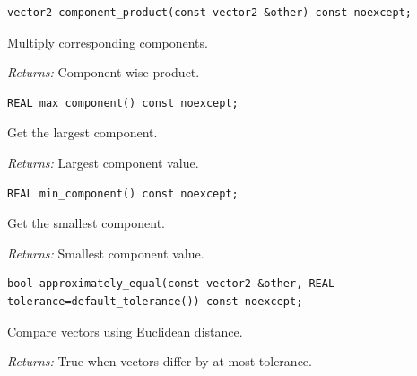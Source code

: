 \par\noindent\begin{minipage}{\linewidth}
\begin{lstlisting}[style=apireference]
vector2 component_product(const vector2 &other) const noexcept;
\end{lstlisting}
{\footnotesize Multiply corresponding components.\par}
{\footnotesize\textit{Returns:} Component-wise product.\par}
\end{minipage}\par\vspace{1pt}
\par\noindent\begin{minipage}{\linewidth}
\begin{lstlisting}[style=apireference]
REAL max_component() const noexcept;
\end{lstlisting}
{\footnotesize Get the largest component.\par}
{\footnotesize\textit{Returns:} Largest component value.\par}
\end{minipage}\par\vspace{1pt}
\par\noindent\begin{minipage}{\linewidth}
\begin{lstlisting}[style=apireference]
REAL min_component() const noexcept;
\end{lstlisting}
{\footnotesize Get the smallest component.\par}
{\footnotesize\textit{Returns:} Smallest component value.\par}
\end{minipage}\par\vspace{1pt}
\par\noindent\begin{minipage}{\linewidth}
\begin{lstlisting}[style=apireference]
bool approximately_equal(const vector2 &other, REAL tolerance=default_tolerance()) const noexcept;
\end{lstlisting}
{\footnotesize Compare vectors using Euclidean distance.\par}
{\footnotesize\textit{Returns:} True when vectors differ by at most tolerance.\par}
\end{minipage}\par\vspace{1pt}
